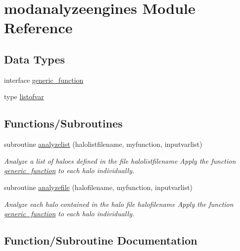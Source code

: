 \hypertarget{namespacemodanalyzeengines}{}\section{modanalyzeengines Module Reference}
\label{namespacemodanalyzeengines}
\subsection*{Data Types}
\begin{DoxyCompactItemize}
\item 
interface \hyperlink{interfacemodanalyzeengines_1_1generic__function}{generic\+\_\+function}
\item 
type \hyperlink{structmodanalyzeengines_1_1listofvar}{listofvar}
\end{DoxyCompactItemize}
\subsection*{Functions/\+Subroutines}
\begin{DoxyCompactItemize}
\item 
subroutine \hyperlink{namespacemodanalyzeengines_a8b4129514638c5b686e9e48dfd32fdff}{analyzelist} (halolistfilename, myfunction, inputvarlist)
\begin{DoxyCompactList}\small\item\em Analyze a list of haloes defined in the file halolistfilename Apply the function \hyperlink{interfacemodanalyzeengines_1_1generic__function}{generic\+\_\+function} to each halo individually. \end{DoxyCompactList}\item 
subroutine \hyperlink{namespacemodanalyzeengines_a3d5a200a3aae5a085e6e05ede050133e}{analyzefile} (halofilename, myfunction, inputvarlist)
\begin{DoxyCompactList}\small\item\em Analyze each halo contained in the halo file halofilename Apply the function \hyperlink{interfacemodanalyzeengines_1_1generic__function}{generic\+\_\+function} to each halo individually. \end{DoxyCompactList}\end{DoxyCompactItemize}


\subsection{Function/\+Subroutine Documentation}
